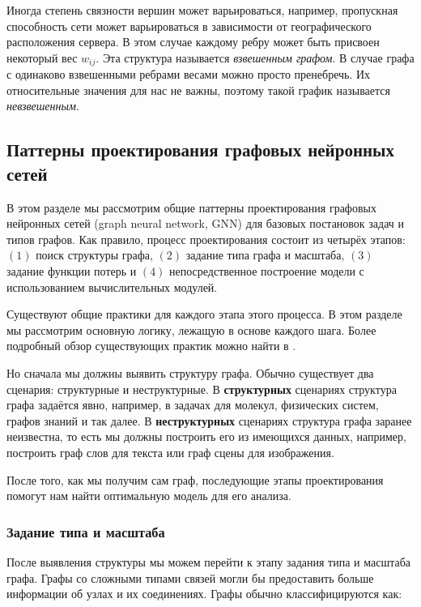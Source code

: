 \documentclass[12pt]{article}
\begin{document}
Иногда степень связности вершин может варьироваться, например, пропускная способность сети может варьироваться в зависимости от географического расположения сервера. В этом случае каждому ребру может быть присвоен некоторый вес $w_{ij}$. Эта структура называется \textit{взвешенным графом}. В случае графа с одинаково взвешенными ребрами весами можно просто пренебречь. Их относительные значения для нас не важны, поэтому такой график называется \textit{невзвешенным}.

\subsection{Паттерны проектирования графовых нейронных сетей}
\label{graph_proj}

В этом разделе мы рассмотрим общие паттерны проектирования графовых нейронных сетей (graph neural network, GNN) для базовых постановок задач и  типов графов. Как правило, процесс проектирования состоит из четырёх этапов: $(1)$ поиск структуры графа, $(2)$ задание типа графа и масштаба, $(3)$ задание функции потерь и $(4)$ непосредственное построение модели с использованием вычислительных модулей.

Существуют общие практики для каждого этапа этого процесса. В этом разделе мы рассмотрим основную логику, лежащую в основе каждого шага. Более подробный обзор существующих практик можно найти в \cite{zhou2020graph}.

Но сначала мы должны выявить структуру графа. Обычно существует два сценария: структурные и неструктурные. В \textbf{структурных} сценариях структура графа задаётся явно, например, в задачах для молекул, физических систем, графов знаний и так далее. В \textbf{неструктурных} сценариях структура графа заранее неизвестна, то есть мы должны построить его из имеющихся данных, например, построить граф слов для текста или граф сцены для изображения. 

После того, как мы получим сам граф, последующие этапы проектирования помогут нам найти оптимальную модель для его анализа.

\subsubsection{Задание типа и масштаба}

После выявления структуры мы можем перейти к этапу задания типа и масштаба графа. Графы со сложными типами связей могли бы предоставить больше информации об узлах и их соединениях. Графы обычно классифицируются как: 
\end{document}
